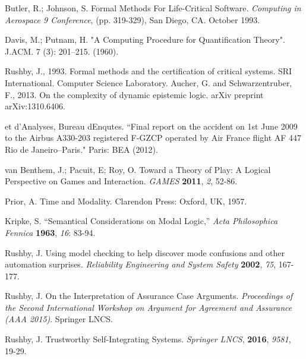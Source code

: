 \begin{thebibliography}{9}
	 	Butler, R.; Johnson, S. Formal Methods For Life-Critical Software. \emph{Computing in Aerospace 9 Conference}, (pp. 319-329), San Diego, CA. October 1993.
	 	
	 	Davis, M.; Putnam, H. "A Computing Procedure for Quantification Theory". J.ACM. 7 (3): 201–215. (1960).
	 	
	 	 Rushby, J., 1993. Formal methods and the certification of critical systems. SRI International. Computer Science Laboratory.
	 	 Aucher, G. and Schwarzentruber, F., 2013. On the complexity of dynamic epistemic logic. arXiv preprint arXiv:1310.6406.
	 	
	 	
	 	
	 	et d'Analyses, Bureau dEnqutes. ``Final report on the accident on 1st June 2009 to the Airbus A330-203 registered F-GZCP operated by Air France flight AF 447 Rio de Janeiro–Paris." Paris: BEA (2012).
	 	
	 	
	 	van Benthem, J.; Pacuit, E; Roy, O. Toward a Theory of Play: A Logical Perspective on Games and Interaction. {\em GAMES} {\bf 2011}, {\em 2}, 52-86.
	 	
	 	Prior, A. Time and Modality. Clarendon Press: Oxford, UK, 1957.
	 	
	 	Kripke, S. “Semantical Considerations on Modal Logic,” {\em Acta Philosophica Fennica} {\bf 1963}, {\em 16}: 83-94.
	 	
	 	Rushby, J. Using model checking to help discover mode confusions and other automation surprises. {\em Reliability Engineering and System Safety} {\bf 2002}, {\em 75}, 167-177.
	 	
	 	Rushby, J. On the Interpretation of Assurance Case Arguments. {\em Proceedings of the Second International Workshop on Argument for Agreement and Assurance (AAA 2015)}. Springer LNCS.
	 	
	 	Rushby, J. Trustworthy Self-Integrating Systems. {\em Springer LNCS}, {\bf 2016}, {\em 9581}, 19-29.
	 	

\end{thebibliography}
